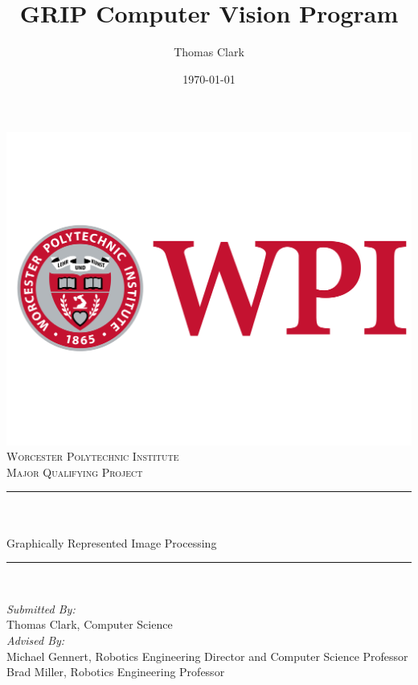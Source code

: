 \documentclass[12pt]{article}
\title{GRIP Computer Vision Program}
\author{Thomas Clark}
\date{\today}
\makeatletter
\let\thetitle\@title
\let\thedate\@date
\makeatother
\begin{document}

\begin{titlepage}
    \centering
    \includegraphics[scale = 0.25]{wpi.png}\\[1.0 cm]
    \textsc{\LARGE Worcester Polytechnic Institute}\\[1.0 cm]
    \textsc{\Large Major Qualifying Project}\\[0.5 cm]
    \rule{\linewidth}{0.2 mm} \\[0.4 cm]
    { \huge \bfseries \thetitle}\\[0.4 cm]
    { \large Graphically Represented Image Processing}\\
    \rule{\linewidth}{0.2 mm} \\[1.0 cm]

    \begin{flushleft}
        \emph{Submitted By:}\\
        Thomas Clark, Computer Science\\
        [0.4 cm]
        \emph{Advised By:}\\
        Michael Gennert, Robotics Engineering Director and Computer Science Professor\\
        Brad Miller, Robotics Engineering Professor\\[2 cm]
       \end{flushleft}

    {\large \thedate}\\[2 cm]

    \vfill

\end{titlepage}
\end{document}
